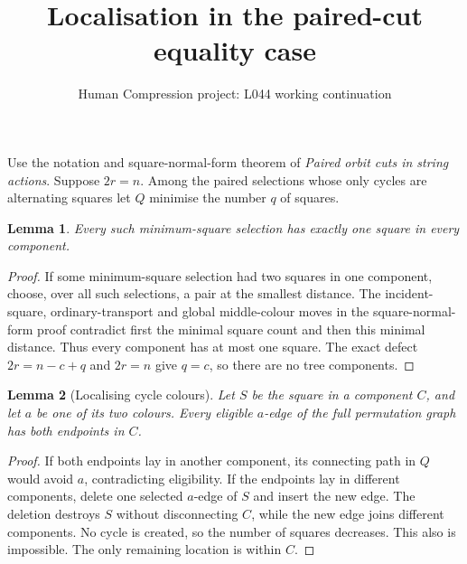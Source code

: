 \documentclass[11pt,a4paper]{article}
\title{Localisation in the paired-cut equality case}
\author{Human Compression project: L044 working continuation}
\date{}
\newtheorem{lemma}{Lemma}
\begin{document}
\maketitle
Use the notation and square-normal-form theorem of \emph{Paired orbit
cuts in string actions}. Suppose $2r=n$. Among the paired selections
whose only cycles are alternating squares let $Q$ minimise the number
$q$ of squares.

\begin{lemma}\label{all}
Every such minimum-square selection has exactly one square in every
component.
\end{lemma}
\begin{proof}
If some minimum-square selection had two squares in one component,
choose, over all such selections, a pair at the smallest distance.
The incident-square, ordinary-transport and global middle-colour
moves in the square-normal-form proof contradict first the minimal
square count and then this minimal distance. Thus every component
has at most one square. The exact defect $2r=n-c+q$ and $2r=n$ give
$q=c$, so there are no tree components.
\end{proof}

\begin{lemma}[Localising cycle colours]\label{colour}
Let $S$ be the square in a component $C$, and let $a$ be one of its
two colours. Every eligible $a$-edge of the full permutation graph
has both endpoints in $C$.
\end{lemma}
\begin{proof}
If both endpoints lay in another component, its connecting path in
$Q$ would avoid $a$, contradicting eligibility. If the endpoints
lay in different components, delete one selected $a$-edge of $S$
and insert the new edge. The deletion destroys $S$ without
disconnecting $C$, while the new edge joins different components.
No cycle is created, so the number of squares decreases. This also
is impossible. The only remaining location is within $C$.
\end{proof}
\end{document}
